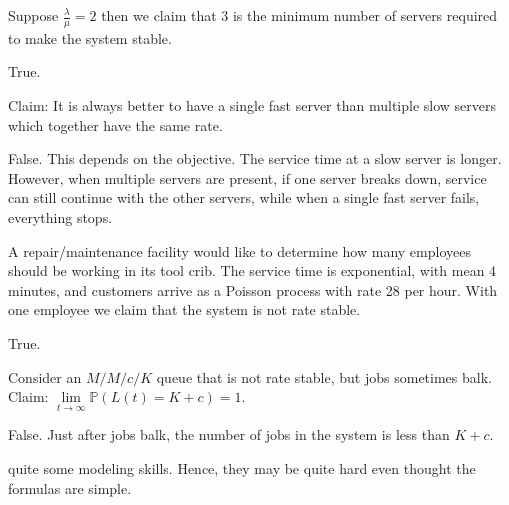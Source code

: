 \documentclass[stochastic-or.tex]{subfiles}
\begin{document}
\begin{truefalse}
    Suppose $\frac{\lambda}{\mu} = 2$ then we claim that 3 is the minimum number of servers required to make the system stable.
    \begin{solution}
        True.
    \end{solution}
\end{truefalse}

\begin{truefalse}
Claim: It is always better to have a single fast server than multiple slow servers which together have the same rate.
    \begin{solution}
    False.
This depends on the objective.
The service time at a slow server is longer.
However, when multiple servers are present, if one server breaks down, service can still continue with the other servers, while when a single fast server fails, everything stops.
    \end{solution}
\end{truefalse}

\begin{truefalse}
A repair/maintenance facility would like to determine how many employees should be working in its tool crib.
The service time is exponential, with mean 4 minutes, and customers arrive as a Poisson process with rate 28 per hour.
With one employee we claim that the system is not rate stable.
\begin{solution}
True.
\end{solution}
\end{truefalse}


\begin{truefalse}
Consider an $M/M/c/K$ queue that is not rate stable, but  jobs sometimes balk. Claim: $\lim\limits_{t\to\infty}\mathbb{P}(L(t)=K+c)=1$.
    \begin{solution}
        False. Just after jobs balk, the number of jobs in the system is less than $K+c$.
    \end{solution}
\end{truefalse}



 quite some modeling skills. Hence, they may be quite hard even thought the formulas are simple.
\end{document}
